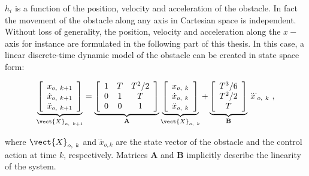 \noindent $h_i$ is a function of the position, velocity and acceleration of the obstacle. In fact the movement of the obstacle along any axis in Cartesian space is independent. Without loss of generality, the position, velocity and acceleration along the $x-$axis for instance are formulated in the following part of this thesis. In this case, a linear discrete-time dynamic model of the obstacle can be created in state space form:
\begin{singlespace}
\begin{equation}\label{eq:state space form}
\underbrace{\left[\begin{array}{c} x_{o,~k+1} \\ \dot{x}_{o,~k+1} \\ \ddot{x}_{o,~k+1}\end{array}\right]}_{\vect{X}_{o,~k+1}}  = \underbrace{\left[\begin{array}{ccc} 1 & T & T^2/2 \\ 0 & 1 & T \\ 0 & 0 & 1 \end{array} \right]}_{\mathbf{A}} \underbrace{\left[\begin{array}{c} x_{o,~k} \\ \dot{x}_{o,~k} \\ \ddot{x}_{o,~k}\end{array}\right]}_{\vect{X}_{o,~k}} + \underbrace{\left[\begin{array}{c} T^3/6 \\ T^2/2 \\ T \end{array} \right]}_{\mathbf{B}} \dddot{x}_{o,~k} ~,
\end{equation}
\end{singlespace}

\noindent where $\vect{X}_{o,~k}$ and $\dddot{x}_{o,k}$ are the state vector of the obstacle and the control action at time $k$, respectively. Matrices $\mathbf{A}$ and $\mathbf{B}$ implicitly describe the linearity of the system.
 
